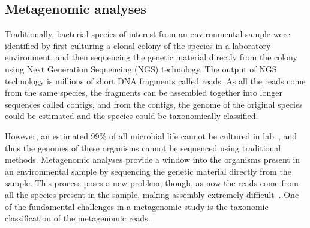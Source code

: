 


\subsection{Metagenomic analyses}\label{back:metagenomic}
Traditionally, bacterial species of interest from an environmental sample were identified by first culturing a clonal colony of the species in a laboratory environment, and then sequencing the genetic material directly from the colony using Next Generation Sequencing (NGS) technology.  The output of NGS technology is millions of short DNA fragments called reads.  As all the reads come from the same species, the fragments can be assembled together into longer sequences called contigs, and from the contigs, the genome of the original species could be estimated and the species could be taxonomically classified.

However, an estimated 99\% of all microbial life cannot be cultured in lab~\cite{todo}, and thus the genomes of these organisms cannot be sequenced using traditional methods.  Metagenomic analyses provide a window into the organisms present in an environmental sample by sequencing the genetic material directly from the sample.  This process poses a new problem, though, as now the reads come from all the species present in the sample, making assembly extremely difficult~\cite{todo}.  One of the fundamental challenges in a metagenomic study is the taxonomic classification of the metagenomic reads.  

